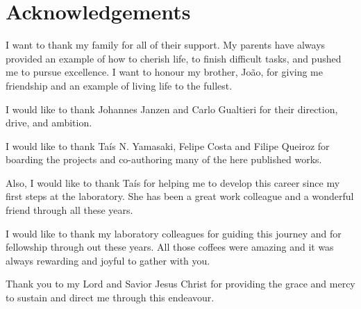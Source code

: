 \chapter*{Acknowledgements}
I want to thank my family for all of their support. My parents have always provided an example of how to cherish life, to finish difficult tasks, and pushed me to pursue excellence. I want to honour my brother, João, for giving me friendship and an example of living life to the fullest.

I would like to thank Johannes Janzen and Carlo Gualtieri for their direction, drive, and ambition.

I would like to thank Taís N. Yamasaki, Felipe Costa and Filipe Queiroz for boarding the projects and co-authoring many of the here published works.

Also, I would like to thank Taís for helping me to develop this career since my first steps at the laboratory. She has been a great work colleague and a wonderful friend through all these years.

I would like to thank my laboratory colleagues for guiding this journey and for fellowship through out these years. All those coffees were amazing and it was always rewarding and joyful to gather with you.

Thank you to my Lord and Savior Jesus Christ for providing the grace and mercy to sustain and direct me through this endeavour.